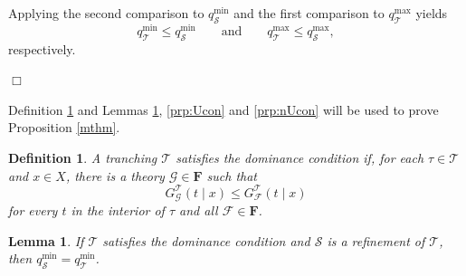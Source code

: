 \documentclass[11pt]{article}
\theoremstyle{plain}
\newtheorem{lmm}{Lemma}%
\newtheorem{dfn}{Definition}%
\begin{document}
Applying the second comparison to $q_{\mathcal{S}}^{\min}$ and the first comparison to $q_{\mathcal{T}}^{\max}$ yields
\[
q_{\mathcal{T}}^{\min}\leq q_{\mathcal{S}}^{\min}
\qquad\text{and}\qquad
q_{\mathcal{T}}^{\max}\leq q_{\mathcal{S}}^{\max},
\]
respectively.

\hfill $\Box$

Definition \ref{def:dom} and Lemmas \ref{Urefine}, \ref{prp:Ucon} and \ref{prp:nUcon} will be used to prove Proposition \ref{mthm}.

\begin{dfn} \label{def:dom}
A tranching $\mathcal{T}$ satisfies the dominance condition if, for each  $\tau\in\mathcal{T}$ and $x\in X$, there is a theory $\mathcal{G}\in\mathbf{F}$ such that
\begin{equation*}
G^{\mathcal{T}}_
{\mathcal{G}}
\left(t\mid x\right)
\leq
G^{\mathcal{T}}_
{\mathcal{F}}
\left(t\mid x\right)
\end{equation*}
for every $t$ in the interior of $\tau$ and all $\mathcal{F}\in\mathbf{F}$.
\end{dfn}

\begin{lmm} \label{Urefine}
If $\mathcal{T}$ satisfies the dominance condition and $\mathcal{S}$ is a refinement of $\mathcal{T}$, then $q_{\mathcal{S}}^{\min}= q_{\mathcal{T}}^{\min}$.
\end{lmm}
\end{document}
